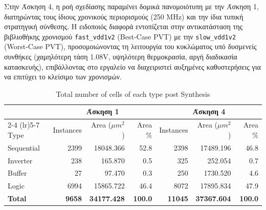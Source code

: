 Στην Άσκηση 4, η ροή σχεδίασης παραμένει δομικά πανομοιότυπη με την Άσκηση 1, διατηρώντας τους ίδιους χρονικούς περιορισμούς (250 MHz) και την ίδια τυπική στρατηγική σύνθεσης. Η ειδοποιός διαφορά εντοπίζεται στην αντικατάσταση της βιβλιοθήκης χρονισμού \texttt{fast\_vdd1v2} (Best-Case PVT) με την \texttt{slow\_vdd1v2} (Worst-Case PVT), προσομοιώνοντας τη λειτουργία του κυκλώματος υπό δυσμενείς συνθήκες (χαμηλότερη τάση 1.08V, υψηλότερη θερμοκρασία, αργή διαδικασία κατασκευής), επιβάλλοντας στο εργαλείο να διαχειριστεί αυξημένες καθυστερήσεις για να επιτύχει το κλείσιμο των χρονισμών.

\begin{table}[H]
    \centering
    \caption{Total number of cells of each type post Synthesis}
    \begin{tabular}{lrrrrrr}
        \toprule
         & \multicolumn{3}{c}{\textbf{Άσκηση 1}} & \multicolumn{3}{c}{\textbf{Άσκηση 4}} \\
        \cmidrule(lr){2-4} \cmidrule(lr){5-7}
        Type & Instances & Area ($\mu m^2$) & Area \% & Instances & Area ($\mu m^2$) & Area \% \\
        \midrule
        Sequential & 2399 & 18048.366 & 52.8 & 2398 & 17489.196 & 46.8 \\
        Inverter & 238 & 165.870 & 0.5 & 325 & 252.054 & 0.7 \\
        Buffer & 27 & 97.470 & 0.3 & 250 & 1730.520 & 4.6 \\
        Logic & 6994 & 15865.722 & 46.4 & 8072 & 17895.834 & 47.9 \\
        \midrule
        \textbf{Total} & \textbf{9658} & \textbf{34177.428} & \textbf{100.0} & \textbf{11045} & \textbf{37367.604} & \textbf{100.0} \\
        \bottomrule
    \end{tabular}
\end{table}


